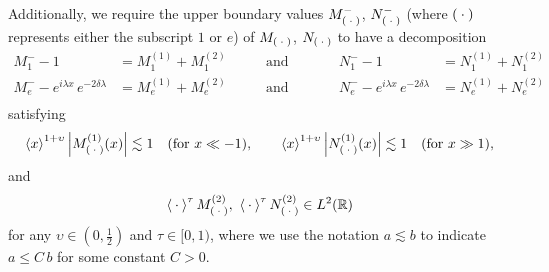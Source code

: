 \documentclass[../dissertation.tex]{subfiles}
\begin{document}
\begin{defn}
	Additionally, we require the upper boundary values $M_{(\kern 0.5ex \cdot \kern 0.5ex)}^-$, $N_{(\kern 0.5ex \cdot \kern 0.5ex)}^-$
	(where $(\kern 0.5ex \cdot \kern 0.5ex)$ represents either the subscript $1$ or $e$) of 
	$M_{(\kern 0.5ex \cdot \kern 0.5ex)}$, $N_{(\kern 0.5ex \cdot \kern 0.5ex)}$ to have a decomposition 
	\begin{align*}
		M_1^- - 1 &= M_1^{(1)} + M_1^{(2)} \qquad &\text{and}& \qquad
		&N_1^- - 1 &= N_1^{(1)} + N_1^{(2)} \\
		M_e^- - e^{i\lambda x}\,e^{-2\delta\lambda} &= M_e^{(1)} + M_e^{(2)} \qquad &\text{and}& \qquad
		&N_e^- - e^{i\lambda x}\,e^{-2\delta\lambda} &= N_e^{(1)} + N_e^{(2)} \\
	\end{align*}
	satisfying 
	\begin{align*}
		\left\langle x \right\rangle^{1+\upsilon} \left|M_{(\kern 0.5ex \cdot \kern 0.5ex)}^{(1)}(x)\right| \lesssim 1 
			\quad (\text{for } x \ll -1), \qquad 
		\left\langle x \right\rangle^{1+\upsilon} \left|N_{(\kern 0.5ex \cdot \kern 0.5ex)}^{(1)}(x)\right| \lesssim 1
			\quad (\text{for } x \gg 1),
	\end{align*}
	and
	\begin{align*}
		\left\langle \kern 0.5ex \cdot \kern 0.5ex \right\rangle^\tau M_{(\kern 0.5ex \cdot \kern 0.5ex)}^{(2)}, 
			~\left\langle \kern 0.5ex \cdot \kern 0.5ex \right\rangle^\tau N_{(\kern 0.5ex \cdot \kern 0.5ex)}^{(2)} \in L^2(\mathbb R)
	\end{align*}
	for any $\upsilon \in \left(0,\frac{1}{2}\right)$ and $\tau \in [0,1)$, where we 
	use the notation  $a\lesssim b$ to indicate $a \leq C \, b$ for some constant $C>0$.
	\label{sym:lesssim}
\end{defn}
\end{document}
